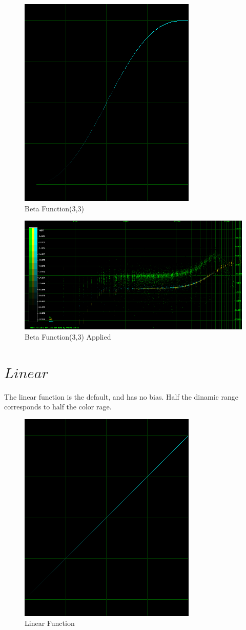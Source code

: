 \documentclass[10pt,a4paper]{report}
\begin{document}
\begin{appendices}
\begin{figure}[H]
	\centering
	\includegraphics[width=0.4\linewidth]{plots/BetaFunctionPlot_2.png}
	\caption[Beta Function(3,3)]{Beta Function(3,3)}
	\label{fig:betafunctionplot2}
\end{figure}

\begin{figure}[H]
	\centering
	\includegraphics[width=1\linewidth]{plots/BetaFunctionPlot_2_Data.png}
	\caption[Beta Function(3,3)]{Beta Function(3,3) Applied}
	\label{fig:betafunctionplot2data}
\end{figure}

\newpage
\section{$Linear$} 

The linear function is the default, and has no bias. Half the dinamic range corresponds to half the color rage.

\begin{figure}[H]
	\centering
	\includegraphics[width=0.4\linewidth]{plots/BetaFunctionPlot_3.png}
	\caption[Linear]{Linear Function}
	\label{fig:betafunctionplot3}
\end{figure}


\end{appendices}
\end{document}
